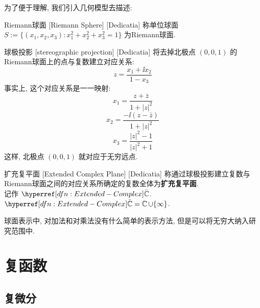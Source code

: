         为了便于理解, 我们引入几何模型去描述: 

        \begin{dfn}
            {Riemann球面}
            [Riemann Sphere]
            [Dedicatia]
            称单位球面 \(S:=\{(x_1,x_2,x_3):x_1^2+x_2^2+x_3^2=1\}\) 为Riemann球面. 
        \end{dfn}

        \begin{ppt}
            {球极投影}
            [stereographic projection]
            [Dedicatia]
            将去掉北极点 \((0,0,1)\) 的Riemann球面上的点与复数建立对应关系: 
            \[z=\frac{x_1+\ii x_2}{1-x_3}\]
            事实上, 这个对应关系是一一映射: 
            \[x_1=\frac{z+\bar{z}}{1+|z|^2}\]
            \[x_2=\frac{-\ii(z-\bar{z})}{1+|z|^2}\]
            \[x_3=\frac{|z|^2-1}{|z|^2+1}\]
            这样, 北极点 \((0,0,1)\) 就对应于无穷远点. 
        \end{ppt}

        \begin{dfn}
            {扩充复平面}
            [Extended Complex Plane]
            [Dedicatia]
            称通过球极投影建立复数与Riemann球面之间的对应关系所确定的复数全体为\textbf{扩充复平面}. \\
            记作 \(\barC\).\\
            \(\barC=\C\cup\{\infty\}\).
        \end{dfn}

        球面表示中, 对加法和对乘法没有什么简单的表示方法, 但是可以将无穷大纳入研究范围中.

\section{复函数}
    
    \subsection{复微分}


